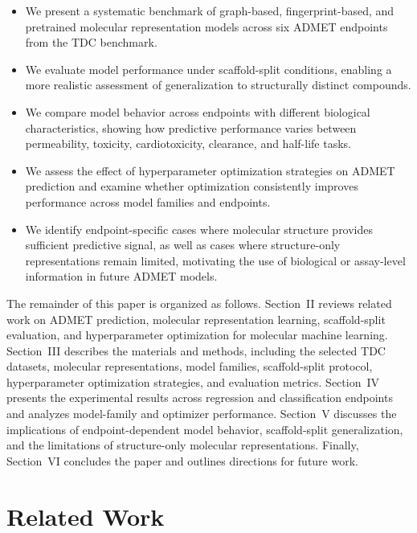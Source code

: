 \documentclass[journal]{IEEEtran}
\begin{document}
\begin{itemize}
    \item We present a systematic benchmark of graph-based, fingerprint-based, and pretrained molecular representation models across six ADMET endpoints from the TDC benchmark.

    \item We evaluate model performance under scaffold-split conditions, enabling a more realistic assessment of generalization to structurally distinct compounds.

    \item We compare model behavior across endpoints with different biological characteristics, showing how predictive performance varies between permeability, toxicity, cardiotoxicity, clearance, and half-life tasks.

    \item We assess the effect of hyperparameter optimization strategies on ADMET prediction and examine whether optimization consistently improves performance across model families and endpoints.

    \item We identify endpoint-specific cases where molecular structure provides sufficient predictive signal, as well as cases where structure-only representations remain limited, motivating the use of biological or assay-level information in future ADMET models.
\end{itemize}

The remainder of this paper is organized as follows.
Section~II reviews related work on ADMET prediction, molecular representation learning, scaffold-split evaluation, and hyperparameter optimization for molecular machine learning.
Section~III describes the materials and methods, including the selected TDC datasets, molecular representations, model families, scaffold-split protocol, hyperparameter optimization strategies, and evaluation metrics.
Section~IV presents the experimental results across regression and classification endpoints and analyzes model-family and optimizer performance.
Section~V discusses the implications of endpoint-dependent model behavior, scaffold-split generalization, and the limitations of structure-only molecular representations.
Finally, Section~VI concludes the paper and outlines directions for future work.

\section{Related Work}
\label{sec:related}
\end{document}
